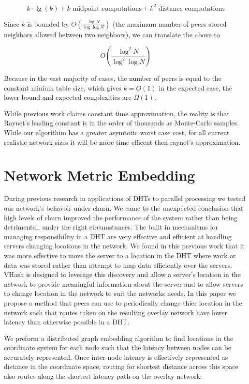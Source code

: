 \documentclass{IEEEtran}
\begin{document}
\[ k\cdot\lg(k) + k \text{ midpoint computations}  + k^{2} \text{ distance computations} \]


Since  $k$ is  bounded by $\Theta(\frac{\log N}{\log \log N} )$ \cite{bern1991expected} (the maximum number of peers stored neighbors allowed between two neighbors), we can translate the above to

\[O(\frac{\log^{2} N}{\log^{2} \log N} )\]

Because in the vast majority of cases, the number of peers is equal to the constant minium table size, which gives $k=O(1)$ in the expected case, the lower bound and expected complexities  are $\Omega{}(1)$.

While previous work \cite{raynet} claims constant time approximation, the reality is that Raynet's leading constant is in the order of thousands as Monte-Carlo samples.  
While our algorithim has a greater asymtotic worst case cost, for all current realistic network sizes it will be more time efficent then raynet's approximation.



\section{Network Metric Embedding}
During previous research in applications of DHTs to parallel processing \cite{andrew-poster} we tested our network's behavoir under churn.
We came to the unexpected conclusion that high levels of churn  improved the performance of the system rather than being detrimental, under the right circumstances.
The built in mechanisms for managing responsibility in a DHT are very effective and efficient at handling servers changing locations in the network.
We found in this previous work that it was more effective to move the server to a location in the DHT where work or data was stored rather than attempt to map data efficiently over the servers.
VHash is designed to leverage this discovery and allow a server's location in the network to provide meaningful information about the server and to allow servers to change location in the network to suit the networks needs.
In this paper we propose a method that peers can use to periodically change thier location in the network such that routes taken on the resulting overlay network have lower latency than otherwise possible in a DHT.

We preform a distributed graph embedding algorithm to find locations in the coordinate system for each node such that the latency between nodes can be accurately represented.
Once inter-node latency is effectively represented as distance in the coordinate space, routing for shortest distance across this space also routes along the shortest latency path on the overlay network.
\end{document}

